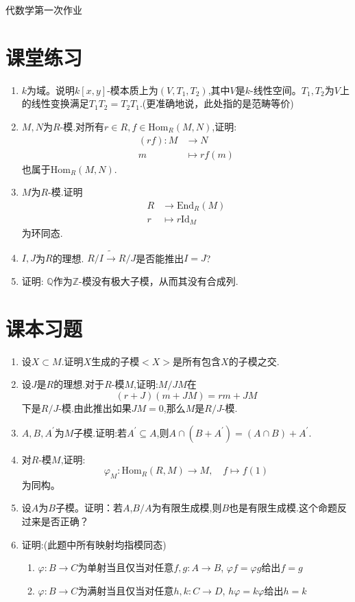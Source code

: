 \documentclass[font=siyuan, 12pt]{article}
\begin{document}
\begin{center}
            \large{代数学第一次作业}
\end{center}

\section{课堂练习}
\begin{enumerate}
    \item $k$为域。说明$k[x,y]$-模本质上为$(V,T_1,T_2)$,其中$V$是$k$-线性空间。$T_1,T_2$为$V$上的线性变换满足$T_1T_2=T_2T_1$.(更准确地说，此处指的是范畴等价)
    \item $M,N$为$R$-模.对所有$r\in R, f\in \mathrm{Hom}_R(M,N)$,证明: \begin{align*}
        (rf):M&\to N \\
        m&\mapsto rf(m)
    \end{align*}
    也属于$\mathrm{Hom}_R(M,N)$.
    \item $M$为$R$-模.证明\begin{align*}
        R&\to \mathrm{End}_R(M)\\
        r&\mapsto r\mathrm{Id}_M
    \end{align*}
    为环同态.
   \item $I,J$为$R$的理想. $R/I\tilde{\to} R/J$是否能推出$I=J$?
   \item 证明: $\mathbb{Q}$作为$\mathbb{Z}$-模没有极大子模，从而其没有合成列.
\end{enumerate}
\section{课本习题}
\begin{enumerate}
    \item 设$X\subset M$.证明$X$生成的子模$<X>$是所有包含$X$的子模之交.
    \item 设$J$是$R$的理想.对于$R$-模$M$,证明:$M/JM$在$$(r+J)(m+JM)=rm+JM$$下是$R/J$-模.由此推出如果$JM=0$,那么$M$是$R/J$-模.
    \item $A,B,A^{'}$为$M$子模.证明:若$A^{'}\subseteq A$,则$A\cap (B+A^{'})=(A\cap B)+A^{'}$.
    \item 对$R$-模$M$,证明:$$\varphi_M :\mathrm{Hom}_R(R,M)\to M,\quad f\mapsto f(1)$$
    为同构。
    \item 设$A$为$B$子模。证明：若$A$,$B/A$为有限生成模,则$B$也是有限生成模.这个命题反过来是否正确？
    \item  证明:(此题中所有映射均指模同态)\begin{enumerate}
    \item $\varphi:B\to C$为单射当且仅当对任意$f,g:A\to B$, $\varphi f=\varphi g$给出$f=g$
    \item $\varphi:B\to C$为满射当且仅当对任意$h,k:C\to D$, $h\varphi =k\varphi $给出$h=k$
    \end{enumerate}
\end{enumerate}
\end{document}
